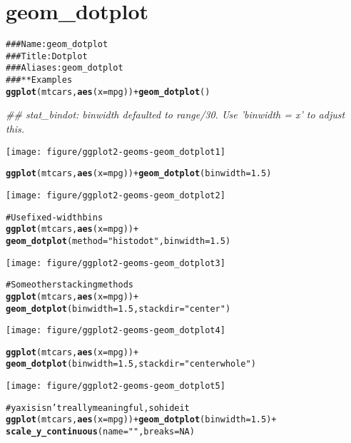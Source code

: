 \documentclass[a4paper,titlepage]{tufte-handout}\usepackage{graphicx, color}
\makeatletter
\def\maxwidth{ %
  \ifdim\Gin@nat@width>\linewidth
    \linewidth
  \else
    \Gin@nat@width
  \fi
}
\newcommand{\hlfunctioncall}[1]{\textcolor[rgb]{0.501960784313725,0,0.329411764705882}{\textbf{#1}}}%
\newcommand{\hlstring}[1]{\textcolor[rgb]{0.6,0.6,1}{#1}}%
\newcommand{\hlcomment}[1]{\textcolor[rgb]{0.180392156862745,0.6,0.341176470588235}{#1}}%
\newenvironment{kframe}{%
 \def\at@end@of@kframe{}%
 \ifinner\ifhmode%
  \def\at@end@of@kframe{\end{minipage}}%
  \begin{minipage}{\columnwidth}%
 \fi\fi%
 \def\FrameCommand##1{\hskip\@totalleftmargin \hskip-\fboxsep
 \colorbox{shadecolor}{##1}\hskip-\fboxsep
     \hskip-\linewidth \hskip-\@totalleftmargin \hskip\columnwidth}%
 \MakeFramed {\advance\hsize-\width
   \@totalleftmargin\z@ \linewidth\hsize
   \@setminipage}}%
 {\par\unskip\endMakeFramed%
 \at@end@of@kframe}
\newenvironment{knitrout}{}{} %
\makeatother
\begin{document}
\section{geom\_dotplot}

\begin{knitrout}
\color{fgcolor}\begin{kframe}
\begin{alltt}
\hlcomment{### Name: geom_dotplot}
\hlcomment{### Title: Dot plot}
\hlcomment{### Aliases: geom_dotplot}
\hlcomment{### ** Examples}
\hlfunctioncall{ggplot}(mtcars, \hlfunctioncall{aes}(x = mpg)) + \hlfunctioncall{geom_dotplot}()
\end{alltt}


{\ttfamily\noindent\itshape\textcolor{messagecolor}{\#\# stat\_bindot: binwidth defaulted to range/30. Use 'binwidth = x' to adjust this.}}\end{kframe}\texttt{[image: figure/ggplot2-geoms-geom\_dotplot1]} \begin{kframe}\begin{alltt}
\hlfunctioncall{ggplot}(mtcars, \hlfunctioncall{aes}(x = mpg)) + \hlfunctioncall{geom_dotplot}(binwidth = 1.5)
\end{alltt}
\end{kframe}\texttt{[image: figure/ggplot2-geoms-geom\_dotplot2]} \begin{kframe}\begin{alltt}
\hlcomment{# Use fixed-width bins}
\hlfunctioncall{ggplot}(mtcars, \hlfunctioncall{aes}(x = mpg)) +
  \hlfunctioncall{geom_dotplot}(method=\hlstring{"histodot"}, binwidth = 1.5)
\end{alltt}
\end{kframe}\texttt{[image: figure/ggplot2-geoms-geom\_dotplot3]} \begin{kframe}\begin{alltt}
\hlcomment{# Some other stacking methods}
\hlfunctioncall{ggplot}(mtcars, \hlfunctioncall{aes}(x = mpg)) +
  \hlfunctioncall{geom_dotplot}(binwidth = 1.5, stackdir = \hlstring{"center"})
\end{alltt}
\end{kframe}\texttt{[image: figure/ggplot2-geoms-geom\_dotplot4]} \begin{kframe}\begin{alltt}
\hlfunctioncall{ggplot}(mtcars, \hlfunctioncall{aes}(x = mpg)) +
  \hlfunctioncall{geom_dotplot}(binwidth = 1.5, stackdir = \hlstring{"centerwhole"})
\end{alltt}
\end{kframe}\texttt{[image: figure/ggplot2-geoms-geom\_dotplot5]} \begin{kframe}\begin{alltt}
\hlcomment{# y axis isn't really meaningful, so hide it}
\hlfunctioncall{ggplot}(mtcars, \hlfunctioncall{aes}(x = mpg)) + \hlfunctioncall{geom_dotplot}(binwidth = 1.5) +
  \hlfunctioncall{scale_y_continuous}(name = \hlstring{""}, breaks = NA)
\end{alltt}



\end{kframe}
\end{knitrout}
\end{document}
